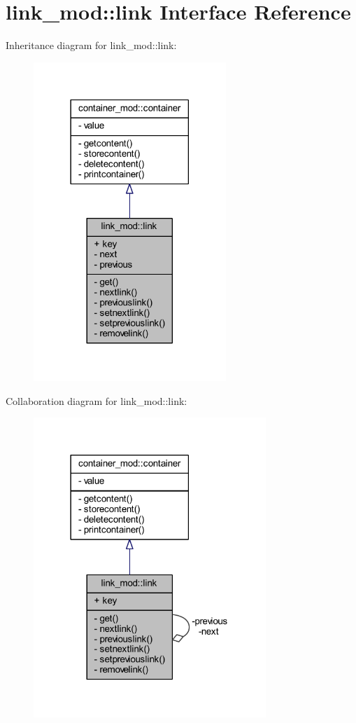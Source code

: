 \hypertarget{structlink__mod_1_1link}{}\section{link\+\_\+mod\+:\+:link Interface Reference}
\label{structlink__mod_1_1link}


Inheritance diagram for link\+\_\+mod\+:\+:link\+:
\nopagebreak
\begin{figure}[H]
\begin{center}
\leavevmode
\includegraphics[width=206pt]{structlink__mod_1_1link__inherit__graph}
\end{center}
\end{figure}


Collaboration diagram for link\+\_\+mod\+:\+:link\+:
\nopagebreak
\begin{figure}[H]
\begin{center}
\leavevmode
\includegraphics[width=249pt]{structlink__mod_1_1link__coll__graph}
\end{center}
\end{figure}
